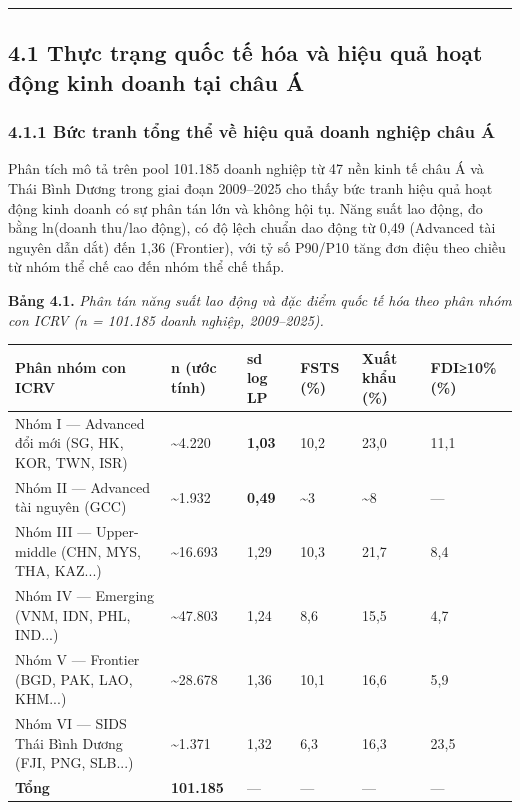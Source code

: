 \documentclass[12pt,a4paper]{article}
\begin{document}
\begin{center}\rule{0.5\linewidth}{0.5pt}\end{center}

\hypertarget{41-thux1ef1c-trux1ea1ng-quux1ed1c-tux1ebf-huxf3a-vuxe0-hiux1ec7u-quux1ea3-houx1ea1t-ux111ux1ed9ng-kinh-doanh-tux1ea1i-chuxe2u-uxe1}{%
\subsection{4.1 Thực trạng quốc tế hóa và hiệu quả hoạt động kinh doanh
tại châu
Á}\label{41-thux1ef1c-trux1ea1ng-quux1ed1c-tux1ebf-huxf3a-vuxe0-hiux1ec7u-quux1ea3-houx1ea1t-ux111ux1ed9ng-kinh-doanh-tux1ea1i-chuxe2u-uxe1}}

\hypertarget{411-bux1ee9c-tranh-tux1ed5ng-thux1ec3-vux1ec1-hiux1ec7u-quux1ea3-doanh-nghiux1ec7p-chuxe2u-uxe1}{%
\subsubsection{4.1.1 Bức tranh tổng thể về hiệu quả doanh nghiệp châu
Á}\label{411-bux1ee9c-tranh-tux1ed5ng-thux1ec3-vux1ec1-hiux1ec7u-quux1ea3-doanh-nghiux1ec7p-chuxe2u-uxe1}}

Phân tích mô tả trên pool 101.185 doanh nghiệp từ 47 nền kinh tế châu Á
và Thái Bình Dương trong giai đoạn 2009--2025 cho thấy bức tranh hiệu
quả hoạt động kinh doanh có sự phân tán lớn và không hội tụ. Năng suất
lao động, đo bằng ln(doanh thu/lao động), có độ lệch chuẩn dao động từ
0,49 (Advanced tài nguyên dẫn dắt) đến 1,36 (Frontier), với tỷ số
P90/P10 tăng đơn điệu theo chiều từ nhóm thể chế cao đến nhóm thể chế
thấp.

\textbf{Bảng 4.1.} \emph{Phân tán năng suất lao động và đặc điểm quốc tế
hóa theo phân nhóm con ICRV (n = 101.185 doanh nghiệp, 2009--2025).}

\begin{longtable}[]{@{}llllll@{}}
\toprule\noalign{}
Phân nhóm con ICRV & n (ước tính) & sd log LP & FSTS (\%) & Xuất khẩu
(\%) & FDI≥10\% (\%) \\
\midrule\noalign{}
\endhead
\bottomrule\noalign{}
\endlastfoot
Nhóm I --- Advanced đổi mới (SG, HK, KOR, TWN, ISR) &
\textasciitilde4.220 & \textbf{1,03} & 10,2 & 23,0 & 11,1 \\
Nhóm II --- Advanced tài nguyên (GCC) & \textasciitilde1.932 &
\textbf{0,49} & \textasciitilde3 & \textasciitilde8 & --- \\
Nhóm III --- Upper-middle (CHN, MYS, THA, KAZ...) &
\textasciitilde16.693 & 1,29 & 10,3 & 21,7 & 8,4 \\
Nhóm IV --- Emerging (VNM, IDN, PHL, IND...) & \textasciitilde47.803 &
1,24 & 8,6 & 15,5 & 4,7 \\
Nhóm V --- Frontier (BGD, PAK, LAO, KHM...) & \textasciitilde28.678 &
1,36 & 10,1 & 16,6 & 5,9 \\
Nhóm VI --- SIDS Thái Bình Dương (FJI, PNG, SLB...) &
\textasciitilde1.371 & 1,32 & 6,3 & 16,3 & 23,5 \\
\textbf{Tổng} & \textbf{101.185} & --- & --- & --- & --- \\
\end{longtable}
\end{document}

